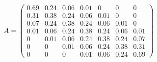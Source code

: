 \documentclass[12pt]{article}
\begin{document}
\begin{equation*}
A =
\begin{pmatrix}
0.69 & 0.24 & 0.06 & 0.01 & 0 & 0 & 0 \\
0.31 & 0.38 & 0.24 & 0.06 & 0.01 & 0 & 0 \\
0.07 & 0.24 & 0.38 & 0.24 & 0.06 & 0.01 & 0 \\
0.01 & 0.06 & 0.24 & 0.38 & 0.24 & 0.06 & 0.01 \\
0 & 0.01 & 0.06 & 0.24 & 0.38 & 0.24 & 0.07 \\
0 & 0 & 0.01 & 0.06 & 0.24 & 0.38 & 0.31 \\
0 & 0 & 0 & 0.01 & 0.06 & 0.24 & 0.69
\end{pmatrix}
\end{equation*}
\end{document}
